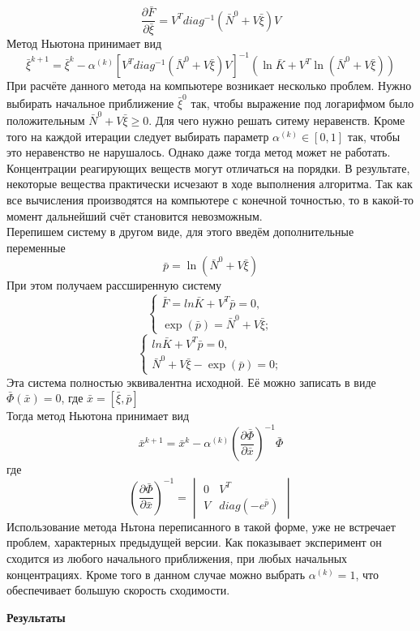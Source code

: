\documentclass[10pt,a4paper]{article}
\begin{document}
$$\frac{\partial \bar{F}}{\partial{\bar{\xi}}} = V^Tdia g^{-1}(\bar{N}^0 + V\bar{\xi})V$$
\hspace*{0.5cm}Метод Ньютона принимает вид
$$\bar{\xi}^{k+1} = \bar{\xi}^{k} - \alpha^{(k)}[V^Tdia g^{-1}(\bar{N}^0 + V\bar{\xi})V]^{-1}(\ln{\bar{K}} + V^T \ln{(\bar{N}^0 + V\bar{\xi})})$$
При расчёте данного метода на компьютере возникает несколько проблем. Нужно выбирать начальное приближение $\bar{\xi}^0$ так, чтобы выражение под логарифмом было положительным $\bar{N}^0 + V\bar{\xi}\geq 0$. Для чего нужно решать ситему неравенств. Кроме того на каждой итерации следует выбирать параметр $\alpha^{(k)} \in [0,1]$ так, чтобы это неравенство не нарушалось. Однако даже тогда метод может не работать. Концентрации реагирующих веществ могут отличаться на порядки. В результате, некоторые вещества практически исчезают в ходе выполнения алгоритма. Так как все вычисления производятся на компьютере с конечной точностью, то в какой-то момент дальнейший счёт становится невозможным.\\
\hspace*{0.5cm}Перепишем систему в другом виде, для этого введём дополнительные переменные $$\bar{p} = \ln{(\bar{N}^0 + V\bar{\xi})}$$ 
\hspace*{0.5cm}При этом получаем рассширенную систему
$$\begin{cases} 
	\bar{F} = ln{\bar{K}} + V^T\bar{p}=0,\\
	\exp(\bar{p})=\bar{N}^0 + V\bar{\xi};
	
\end{cases}$$
$$\begin{cases} 
	ln{\bar{K}} + V^T\bar{p}=0,\\
	\bar{N}^0 + V\bar{\xi} - \exp(\bar{p}) = 0;
\end{cases}$$
Эта система полностью эквивалентна исходной. Её можно записать в виде
\hspace*{3.5 cm} $\bar{\Phi}(\bar{x}) = 0$, где $ \bar{x} = [\bar{\xi}, \bar{p}]$\\
Тогда метод Ньютона принимает вид\\
$$\bar{x}^{k+1} = \bar{x}^{k} - \alpha^{(k)}(\frac{\partial\bar{\Phi}}{\partial \bar{x}})^{-1}\bar{\Phi}$$
 где $$(\frac{\partial\bar{\Phi}}{\partial \bar{x}})^{-1} = \begin{vmatrix}
 0 & V^T \\
 V & diag({-e^{\bar{p}}})
\end{vmatrix}  $$
Использование метода Ньтона переписанного в такой форме, уже не встречает проблем, характерных предыдущей версии. Как показывает эксперимент он сходится из любого начального приближения, при любых начальных концентрациях. Кроме того в данном случае можно выбрать $\alpha^{(k)} = 1$, что обеспечивает большую скорость сходимости.
\par\textbf{Результаты}\\ 
\end{document}

